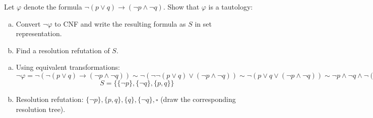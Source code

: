 \begin{problem}

    Let $\varphi$ denote the formula $\neg (p \vee q) \to (\neg p \wedge \neg q)$. Show that $\varphi$ is a tautology:
    \begin{enumerate}[(a)]
        \item Convert $\neg \varphi$ to CNF and write the resulting formula as $S$ in set representation.
        \item Find a resolution refutation of $S$.
    \end{enumerate}

    \begin{solution}

        \begin{enumerate}[(a)]
            \item Using equivalent transformations: $\neg\varphi=\neg(\neg (p \vee q) \to (\neg p \wedge \neg q))\sim\neg(\neg \neg (p \vee q) \lor (\neg p \wedge \neg q))\sim\neg(p \vee q \vee (\neg p \wedge \neg q))\sim \neg p \land \neg q \land  \neg (\neg p \wedge \neg q)\sim\neg p \land \neg q \land  (p \lor q)$
            $$
            S = \{\{\neg p\},\{\neg q\},\{p,q\}\}
            $$
            \item Resolution refutation: $\{\neg p\},\{p,q\},\{q\},\{\neg q\},\square$ (draw the corresponding resolution tree).
        \end{enumerate}
                    
    \end{solution}

\end{problem}


